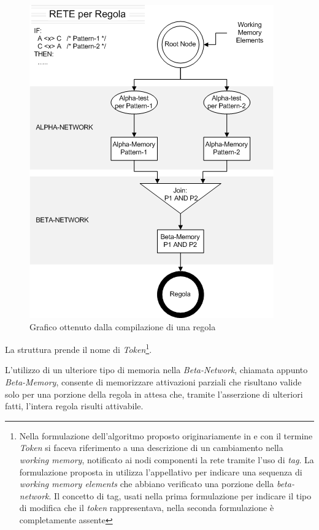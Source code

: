 \begin{figure}
\centering
\includegraphics[scale=0.7]{Immagini/Capitolo1/grafico-regola-rete.png}
\caption{Grafico ottenuto dalla compilazione di una regola}\label{fig:grafico-regola}
\end{figure}


La struttura prende il nome di \emph{Token}\footnote{Nella formulazione dell'algoritmo proposto originariamente in \cite{forgy1979} e \cite{forgy1982} con il termine \emph{Token} si faceva riferimento a una descrizione di un cambiamento nella \emph{working memory}, notificato ai nodi componenti la rete tramite l'uso di \emph{tag}. La formulazione proposta in \cite{Doorenbos95productionmatching} utilizza l'appellativo per indicare una sequenza di \emph{working memory elements} che abbiano verificato una porzione della \emph{beta-network}. Il concetto di tag, usati nella prima formulazione per indicare il tipo di modifica che il \emph{token} rappresentava, nella seconda formulazione è completamente assente}.

L'utilizzo di un ulteriore tipo di memoria nella \emph{Beta-Network}, chiamata appunto \emph{Beta-Memory}, consente di memorizzare attivazioni parziali che risultano valide solo per una porzione della regola in attesa che, tramite l'asserzione di ulteriori fatti, l'intera regola risulti attivabile.

